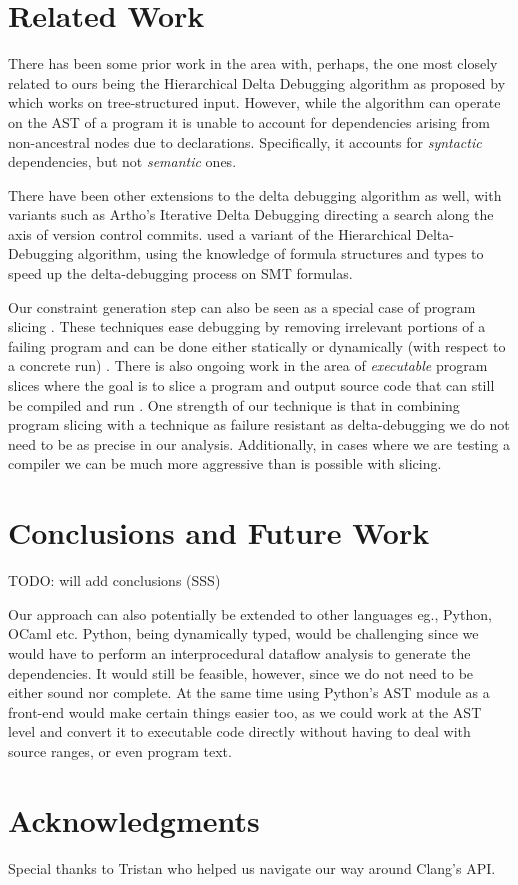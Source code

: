 \documentclass[preprint]{acm_proc_article-sp}
\begin{document}
\section{Related Work}

There has been some prior work in the area with, perhaps, the one most closely
related to ours being the Hierarchical Delta Debugging algorithm as proposed by
\citet{hdd} which works on tree-structured input. However, while
the algorithm can operate on the AST of a program it is unable to account for
dependencies arising from non-ancestral nodes due to declarations. Specifically,
it accounts for \emph{syntactic} dependencies, but not \emph{semantic} ones.

There have been other extensions to the delta debugging algorithm as well, with
variants such as Artho's Iterative Delta Debugging \citep{idd} directing a search
along the axis of version control commits. \citet{smt} used a
variant of the Hierarchical Delta-Debugging algorithm, using the knowledge of
formula structures and types to speed up the delta-debugging process on SMT
formulas.

Our constraint generation step can also be seen as a special case of program
slicing \citep{weiser81} \citep{tip94}. These techniques ease debugging by
removing irrelevant portions of a failing program and can be done either
statically or dynamically (with respect to a concrete run)
\citep{agrawal90}. There is also ongoing work in the area of \emph{executable}
program slices where the goal is to slice a program and output source code
that can still be compiled and run \citep{horwitz10}. One strength of our
technique is that in combining program slicing with a technique as failure
resistant as delta-debugging we do not need to be as precise in our
analysis. Additionally, in cases where we are testing a compiler we can be much
more aggressive than is possible with slicing.


\section{Conclusions and Future Work}
TODO: will add conclusions (SSS)

Our approach can also potentially be extended to other languages eg., Python,
OCaml etc. Python, being dynamically typed, would be challenging since we would
have to perform an interprocedural dataflow analysis to generate the
dependencies. It would still be feasible, however, since we do not need to be
either sound nor complete. At the same time using Python's AST module as a
front-end would make certain things easier too, as we could work at the AST
level and convert it to executable code directly without having to deal with
source ranges, or even program text.

\section{Acknowledgments}
Special thanks to Tristan who helped us navigate our way around Clang's API.



\end{document}
